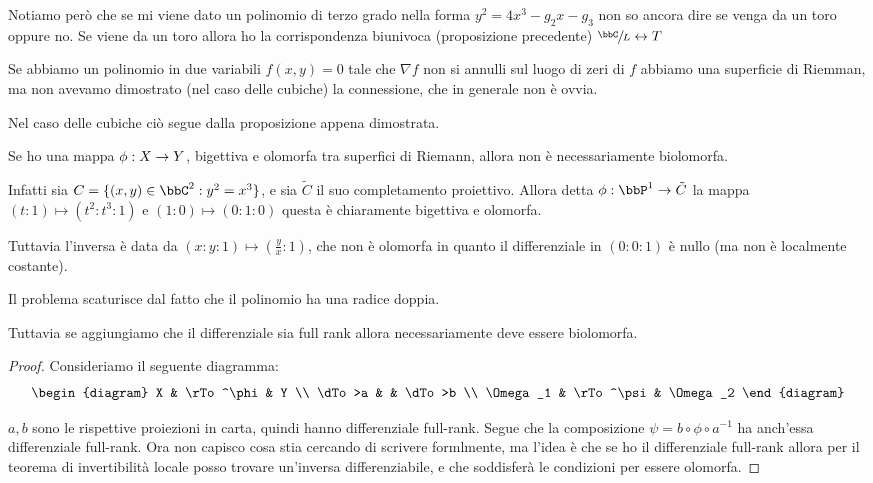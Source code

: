 \begin{osservazione}
  Notiamo però che se mi viene dato un polinomio di terzo grado nella
  forma $y^2 = 4x^3 - g_2 x - g_3$ non so ancora dire se venga da un
  toro oppure no. Se viene da un toro allora ho la corrispondenza
  biunivoca (proposizione precedente) $\sfrac{\bbC}{L} \leftrightarrow T$
\end{osservazione}

\begin{osservazione}
  Se abbiamo un polinomio in due variabili $f(x, y) = 0$ tale che
  $\nabla f$ non si annulli sul luogo di zeri di $f$ abbiamo una
  superficie di Riemman, ma non avevamo dimostrato (nel caso delle
  cubiche) la connessione, che in generale non è ovvia.

  Nel caso delle cubiche ciò segue dalla proposizione appena dimostrata.
\end{osservazione}


  Se ho una mappa $\phi: X \rightarrow Y$, bigettiva e olomorfa tra superfici di Riemann, allora non è necessariamente biolomorfa.

  Infatti sia $C = \{ (x,y) \in \bbC^2 : y^2=x^3 \}$, e sia $\tilde C$ il suo completamento proiettivo. Allora detta $\phi: \bbP^1 \rar \tilde C$ la mappa $ (t : 1) \mapsto (t^2 : t^3 : 1)$ e $(1 : 0) \mapsto (0:1:0)$ questa è chiaramente bigettiva e olomorfa.

  Tuttavia l'inversa è data da $(x:y:1) \mapsto (\frac yx:1)$, che non è olomorfa in quanto il differenziale in $(0:0:1)$ è nullo (ma non è localmente costante).

  Il problema scaturisce dal fatto che il polinomio ha una radice doppia.

  Tuttavia se aggiungiamo che il differenziale sia full rank allora necessariamente deve essere biolomorfa.
  \begin{proof}
      Consideriamo il seguente diagramma:
      \[
      \begin{diagram}
          X & \rTo^\phi & Y \\
          \dTo>a & & \dTo>b \\
          \Omega_1 & \rTo^\psi & \Omega_2
      \end{diagram}
      \]

      $a, b$ sono le rispettive proiezioni in carta, quindi hanno differenziale full-rank. Segue che la composizione $\psi = b\circ \phi \circ a^{-1}$ ha anch'essa differenziale full-rank.
      Ora non capisco cosa stia cercando di scrivere formlmente, ma l'idea è che se ho il differenziale full-rank allora per il teorema di invertibilità locale posso trovare un'inversa differenziabile, e che soddisferà le condizioni per essere olomorfa. %
  \end{proof}

